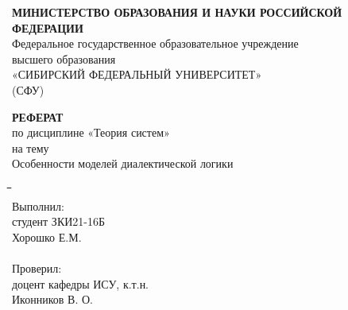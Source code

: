 \documentclass[a4paper,12pt]{report}
\author{}
\begin{document}
	
	\title{}
	\pagestyle{empty} 
	\begin{center}
	\Large  \textbf {МИНИСТЕРСТВО ОБРАЗОВАНИЯ И НАУКИ РОССИЙСКОЙ ФЕДЕРАЦИИ}\\
\Large  Федеральное государственное образовательное учреждение\\ высшего образования\\
«СИБИРСКИЙ ФЕДЕРАЛЬНЫЙ УНИВЕРСИТЕТ»\\
(СФУ)\\
\vspace{0.2em}




\end{center}

\vspace{8em}
\begin{center}
	\Large \textbf{ РЕФЕРАТ\\ } %
	\vspace{1em} по дисциплине «Теория систем»\\
\vspace{0.5em} на тему \\
\vspace{0.5em} Особенности моделей диалектической логики\\
\end{center}
\vspace{0.5em}
\textsl{}
\vspace{6em}
\begin{flushleft}
\begin{tabbing}
\quad\= \quad\= \quad\= \quad\= \quad\= \quad\= \quad\= \quad\= \quad\= \quad\=\quad\=\quad\=\quad\=\quad\=\quad\=\quad\= \quad\=\quad\=\quad\=\quad\=\quad\=\quad\= \quad\= \quad\= \quad\= \quad\= \’\\
\> \> \> \> \> \> \> \>  \> \> \> \> \>  \> \> \> \> \> \> \> \> \> \> \>Выполнил:\’ \\
\> \> \> \> \> \> \> \>  \> \> \> \> \>  \> \> \> \> \> \> \> \> \> \> \>студент ЗКИ21-16Б \\
 \> \> \> \> \> \> \> \>  \> \> \> \> \>  \> \> \> \> \> \> \> \> \> \> \>Хорошко Е.М.\’ \\\\
\vspace{1.5em}
\> \> \> \> \> \> \> \>  \> \> \> \> \>  \> \> \> \> \> \> \> \>  \> \> \> Проверил:\’\\
\> \> \> \> \> \> \> \>  \> \> \> \> \>  \> \> \> \> \> \> \> \>  \> \> \> доцент кафедры ИСУ, к.т.н.\’ \\
\> \> \> \> \> \> \> \>  \> \> \> \> \>  \> \> \> \> \> \> \> \>  \> \> \>  Иконников В. О. \’ \\\\


\vspace{2.5em}
\end{tabbing}
\end{flushleft}
\end{document}
